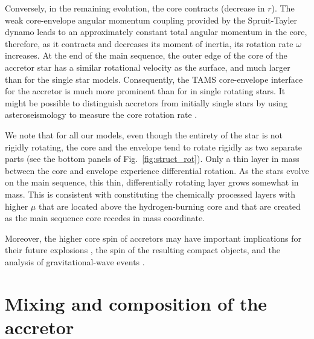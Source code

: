 \documentclass[twocolumn,twocolappendix,trackchanges]{aastex63}
\DeclareRobustCommand{\Figref}[1]{Fig.~\ref{#1}}
\begin{document}
Conversely, in the remaining evolution, the core contracts (decrease
in $r$). The weak core-envelope angular momentum coupling provided by
the Spruit-Tayler dynamo leads to an approximately constant total
angular momentum in the core, therefore, as it contracts and decreases
its moment of inertia, its rotation rate $\omega$ increases.  At the end of the main sequence, the outer edge of the
core of the accretor star has a similar rotational velocity as the
surface, and much larger than for the single star models.
Consequently, the TAMS core-envelope interface
for the accretor is much more prominent than for in single rotating
stars. It might be possible to distinguish accretors from
initially single stars by using asteroseismology to measure the core
rotation rate \citep[e.g.,][]{cantiello:14}. 

We note that for all our models, even though the entirety of the star is not rigidly rotating, the core and the envelope tend to rotate rigidly as two separate parts (see the bottom panels of \Figref{fig:struct_rot}). Only a thin layer in mass between the core and envelope experience differential rotation. As the stars evolve on the main sequence, this thin, differentially rotating layer grows somewhat in mass. This is consistent with constituting the chemically processed layers with higher $\mu$ that are located above the hydrogen-burning core and that are created as the main sequence core recedes in mass coordinate.

Moreover, the higher core spin of accretors may have
important implications for their future explosions
\citep[e.g.][]{macfadyen:99, cantiello:07}, the spin of the
resulting compact objects, and the analysis of gravitational-wave
events \citep[e.g.,][]{zaldarriaga:18, qin:18, callister:21}. 



\section{Mixing and composition of the accretor}
\label{sec:mixing}
\end{document}
